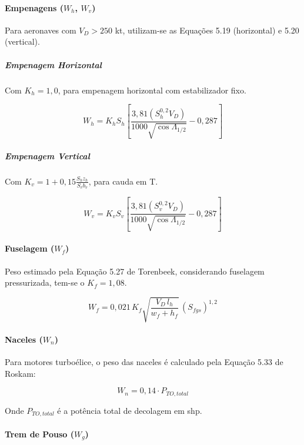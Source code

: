 \paragraph{Empenagens ($W_h$, $W_v$)}

Para aeronaves com $V_D > 250$ kt, utilizam-se as Equações 5.19 (horizontal) e 5.20 (vertical).
\subparagraph{Empenagem Horizontal}

Com $K_h = 1,0$, para empenagem horizontal com estabilizador fixo.

\begin{equation}
W_h = K_h S_h \left[
\frac{3,81 \left( S_h^{0,2} V_D \right)}{1000 \sqrt{\cos \Lambda_{1/2}}}
- 0,287
\right]
\end{equation}

\subparagraph{Empenagem Vertical}

Com $K_v = 1 + 0,15 \frac{S_h z_h}{S_v b_v}$, para cauda em T.

\begin{equation}
W_v = K_v S_v \left[
\frac{3,81 \left( S_v^{0,2} V_D \right)}{1000 \sqrt{\cos \Lambda_{1/2}}}
- 0,287
\right]
\end{equation}


\paragraph{Fuselagem ($W_f$)}

Peso estimado pela Equação 5.27 de Torenbeek, considerando fuselagem pressurizada, tem-se o $K_f = 1,08$.

\begin{equation}
W_f = 0,021 \, K_f \sqrt{\frac{V_D \, l_h}{w_f + h_f}} \, (S_{fgs})^{1,2}
\end{equation}


\paragraph{Naceles ($W_n$)}

Para motores turboélice, o peso das naceles é calculado pela Equação 5.33 de Roskam:

\begin{equation}
W_n = 0,14 \cdot P_{TO,total}
\end{equation}

Onde $P_{TO,total}$ é a potência total de decolagem em shp.


\paragraph{Trem de Pouso ($W_g$)}

